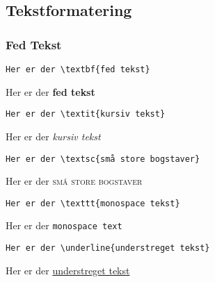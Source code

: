 \subsection{Tekstformatering}

\subsubsection{Fed Tekst}

\begin{verbatim}
Her er der \textbf{fed tekst}
\end{verbatim}

Her er der \textbf{fed tekst} 


\begin{verbatim}
Her er der \textit{kursiv tekst}
\end{verbatim}

Her er der \textit{kursiv tekst} 


\begin{verbatim}
Her er der \textsc{små store bogstaver}
\end{verbatim}

Her er der \textsc{små store bogstaver} 


\begin{verbatim}
Her er der \texttt{monospace tekst}
\end{verbatim}

Her er der \texttt{monospace text} 


\begin{verbatim}
Her er der \underline{understreget tekst}
\end{verbatim}

Her er der \underline{understreget tekst}
